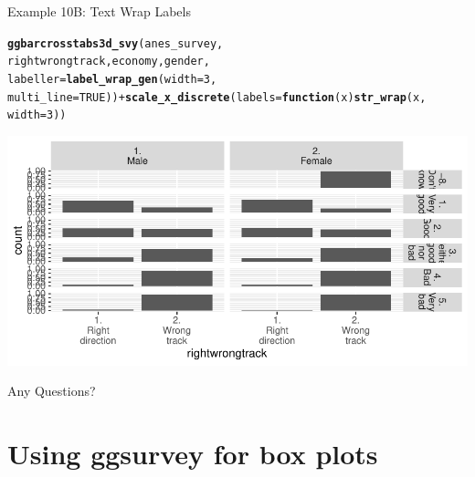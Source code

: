 \documentclass{beamer}\usepackage[]{graphicx}\usepackage[]{xcolor}
\makeatletter
\newcommand{\hlnum}[1]{\textcolor[rgb]{0.686,0.059,0.569}{#1}}%
\newcommand{\hlopt}[1]{\textcolor[rgb]{0,0,0}{#1}}%
\newcommand{\hlstd}[1]{\textcolor[rgb]{0.345,0.345,0.345}{#1}}%
\newcommand{\hlkwa}[1]{\textcolor[rgb]{0.161,0.373,0.58}{\textbf{#1}}}%
\newcommand{\hlkwc}[1]{\textcolor[rgb]{0.333,0.667,0.333}{#1}}%
\newcommand{\hlkwd}[1]{\textcolor[rgb]{0.737,0.353,0.396}{\textbf{#1}}}%
\newenvironment{kframe}{%
 \def\at@end@of@kframe{}%
 \ifinner\ifhmode%
  \def\at@end@of@kframe{\end{minipage}}%
  \begin{minipage}{\columnwidth}%
 \fi\fi%
 \def\FrameCommand##1{\hskip\@totalleftmargin \hskip-\fboxsep
 \colorbox{shadecolor}{##1}\hskip-\fboxsep
     \hskip-\linewidth \hskip-\@totalleftmargin \hskip\columnwidth}%
 \MakeFramed {\advance\hsize-\width
   \@totalleftmargin\z@ \linewidth\hsize
   \@setminipage}}%
 {\par\unskip\endMakeFramed%
 \at@end@of@kframe}
\newenvironment{knitrout}{}{} %
\makeatother
\begin{document}
\begin{frame}[fragile]{Example 10B: Text Wrap Labels}

\begin{knitrout}
\color{fgcolor}\begin{kframe}
\begin{alltt}
\hlkwd{ggbarcrosstabs3d_svy}\hlstd{(anes_survey,}
    \hlstd{rightwrongtrack, economy, gender,}
    \hlkwc{labeller} \hlstd{=} \hlkwd{label_wrap_gen}\hlstd{(}\hlkwc{width} \hlstd{=} \hlnum{3}\hlstd{,}
        \hlkwc{multi_line} \hlstd{=} \hlnum{TRUE}\hlstd{))} \hlopt{+} \hlkwd{scale_x_discrete}\hlstd{(}\hlkwc{labels} \hlstd{=} \hlkwa{function}\hlstd{(}\hlkwc{x}\hlstd{)} \hlkwd{str_wrap}\hlstd{(x,}
    \hlkwc{width} \hlstd{=} \hlnum{3}\hlstd{))}
\end{alltt}
\end{kframe}
\includegraphics[width=0.95\linewidth]{figure/unnamed-chunk-62-1} 
\end{knitrout}
\end{frame}

\begin{frame}{Any Questions?}
\end{frame}

\section{Using ggsurvey for box plots}
\end{document}
